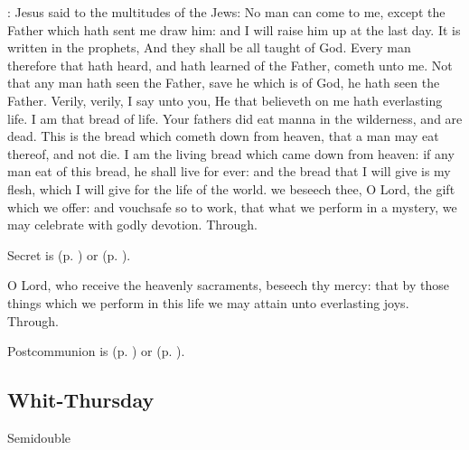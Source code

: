 : Jesus said to the multitudes of the Jews: No man can come to me, except the Father which hath sent me draw him: and I will raise him up at the last day. It is written in the prophets, And they shall be all taught of God. Every man therefore that hath heard, and hath learned of the Father, cometh unto me. Not that any man hath seen the Father, save he which is of God, he hath seen the Father. Verily, verily, I say unto you, He that believeth on me hath everlasting life. I am that bread of life. Your fathers did eat manna in the wilderness, and are dead. This is the bread which cometh down from heaven, that a man may eat thereof, and not die. I am the living bread which came down from heaven: if any man eat of this bread, he shall live for ever: and the bread that I will give is my flesh, which I will give for the life of the world.
\secret
{} we beseech thee, O Lord, the gift which we offer: and vouchsafe so to work, that what we perform in a mystery, we may celebrate with godly devotion. Through.
\begin{rubric}
     Secret is  (p. \pageref{SPAgainst}) or  (p. \pageref{SPChiefBishop}).
\end{rubric}
\postcommunion
{} O Lord, who receive the heavenly sacraments, beseech thy mercy: that by those things which we perform in this life we may attain unto everlasting joys. Through.
\begin{rubric}
     Postcommunion is  (p. \pageref{SPAgainst}) or  (p. \pageref{SPChiefBishop}).
\end{rubric}

\clearpage

\subsection{Whit-Thursday}
\begin{inhead}
    {Semidouble}
\end{inhead}
\fancyhead[RE,LO]{}


